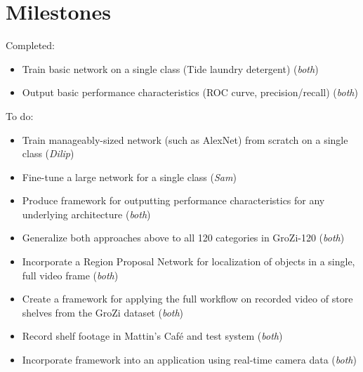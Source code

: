 \documentclass{article}
\begin{document}
\section{Milestones}

Completed:

\begin{itemize}

	\item Train basic network on a single class (Tide laundry detergent) (\textit{both})

	\item Output basic performance characteristics (ROC curve, precision/recall) (\textit{both})

\end{itemize}

To do:

\begin{itemize}

	\item Train manageably-sized network (such as AlexNet) from scratch on a single class (\textit{Dilip})

	\item Fine-tune a large network for a single class (\textit{Sam})

	\item Produce framework for outputting performance characteristics for any underlying architecture (\textit{both})

	\item Generalize both approaches above to all 120 categories in GroZi-120
	(\textit{both})

	\item Incorporate a Region Proposal Network for localization of objects in a single, full video frame (\textit{both})

	\item Create a framework for applying the full workflow on recorded video of store shelves from the GroZi dataset (\textit{both})

	\item Record shelf footage in Mattin's Café and test system (\textit{both})

	\item Incorporate framework into an application using real-time camera data (\textit{both})

\end{itemize}



\end{document}
